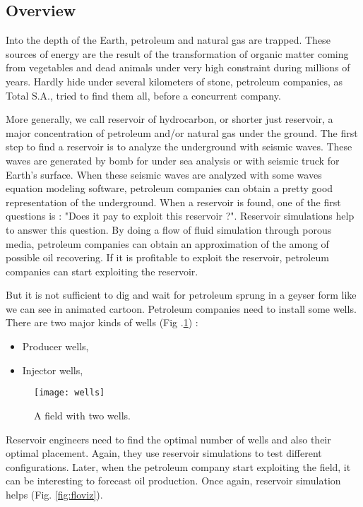 \subsection{Overview}

Into the depth of the Earth, petroleum and natural gas are trapped.
%
These sources of energy are the result of the transformation of organic matter coming from vegetables and dead animals under very high constraint during millions of years.
%
Hardly hide under several kilometers of stone, petroleum companies, as Total S.A., tried to find them all, before a concurrent company.



More generally, we call reservoir of hydrocarbon, or shorter just reservoir, a major concentration of petroleum and/or natural gas under the ground.
%
The first step to find a reservoir is to analyze the underground with seismic waves.
%
These waves are generated by bomb for under sea analysis or with seismic truck for Earth's surface.
%
When these seismic waves are analyzed with some waves equation modeling software, petroleum companies can obtain a pretty good representation of the underground.
%
When a reservoir is found, one of the first questions is : "Does it pay to exploit this reservoir ?".
%
Reservoir simulations help to answer this question.
%
By doing a flow of fluid simulation through porous media, petroleum companies can obtain an approximation of the among of possible oil recovering.
%
If it is profitable to exploit the reservoir, petroleum companies can start exploiting the reservoir.



But it is not sufficient to dig and wait for petroleum sprung in a geyser form like we can see in animated cartoon.
%
Petroleum companies need to install some wells.
%
There are two major kinds of wells (Fig .\ref{fig:wells}) :
%
\begin{itemize}
  \item Producer wells,
  \item Injector wells,
\end{itemize}

\begin{figure}[!ht]
  \centering
  \texttt{[image: wells]}
  \caption{A field with two wells.}
\label{fig:wells}
\end{figure}


Reservoir engineers need to find the optimal number of wells and also their optimal placement.
%
Again, they use reservoir simulations to test different configurations.
%
Later, when the petroleum company start exploiting the field, it can be interesting to forecast oil production.
%
Once again, reservoir simulation helps (Fig. \ref{fig:floviz}).

